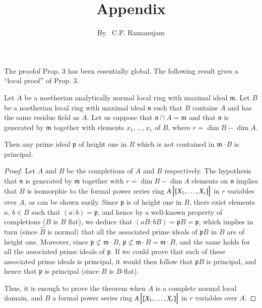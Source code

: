 \title{Appendix}\label{apen}

\author{By~ C.P. Ramanujam}

\date{}
\maketitle

\setcounter{page}{165}
\setcounter{pageoriginal}{129}
The proof\pageoriginale of Prop. 3 has been essentially global. The following result gives a ``local proof'' of Prop. 3. 

\begin{prop*}
Let $A$ be a noetherian analytically normal local ring with maximal ideal $\mathfrak{m}$. Let $B$ be a noetherian local ring with maximal ideal $\mathfrak{n}$ such that $B$ contains $A$ and has the same residue field as $A$. Let us suppose that $\mathfrak{n} \cap A = \mathfrak{m}$ and that $\mathfrak{n}$ is generated by $\mathfrak{m}$ together with elements $x_1, \ldots, x_r$ of $B$, where $r = \dim B - \dim A$.

Then any prime ideal $\mathfrak{p}$ of height one in $B$ which is not contained in $\mathfrak{m} \cdot B$ is principal.
\end{prop*}

\begin{proof}
Let $A$ and $B$ be the completions of $A$ and $B$ respectively. The hypothesis that $\mathfrak{n}$ is generated by $\mathfrak{m}$ together with $r = \dim B - \dim A$ elements on $\mathfrak{n}$ implies that $B$ is isomorphic to the formal power series ring $A \left[[X_1, \ldots, X_r] \frac{}{} \hspace{-0.1cm}\right]$ in $r$ variables over $A$, as can be shown easily. Since $\mathfrak{p}$ is of height one in $B$, there exist elements $a$, $b \in B$ such that $(a:b)= \mathfrak{p}$, and hence by a well-known property of completions ($B$ is $B$ flat), we deduce that $(a B : bB) = \mathfrak{p} B = \mathfrak{p}$, which implies in turn (since $\hat{B}$ is normal) that all the associated prime ideals of $\mathfrak{p} B$ in $B$ are of height one. Moreover, since $\mathfrak{p} \not\subset \mathfrak{m}\cdot B$, $\mathfrak{p} \not\subset \mathfrak{m} \cdot B = \mathfrak{m} \cdot B$, and the same holds for all the associated prime ideals of $\mathfrak{p}$. If we could prove that each of these associated prime ideals is principal, it would then follow that $\mathfrak{p}B$ is principal, and hence that $\mathfrak{p}$ is principal (since $B$ is $B$-flat).

Thus, it is enough to prove the theorem when $A$ is a complete normal local domain, and $B$ a formal power series ring $A \left[ [X_1, \ldots, X_r]\frac{}{} \hspace{-0.1cm} \right]$ in $r$ variables over $A$. 
\end{proof}

